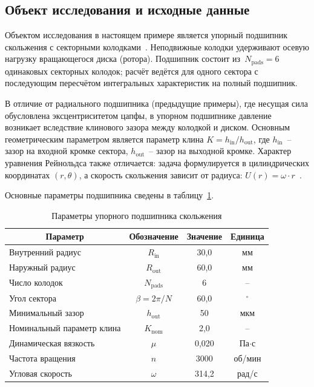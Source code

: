 \subsection{Объект исследования и исходные данные}

Объектом исследования в настоящем примере является упорный подшипник
скольжения с секторными колодками~\cite{gropper2018,wasilczuk2008}. Неподвижные колодки удерживают
осевую нагрузку вращающегося диска (ротора). Подшипник состоит
из~$N_{\mathrm{pads}} = 6$ одинаковых секторных колодок; расчёт
ведётся для одного сектора с последующим пересчётом интегральных
характеристик на полный подшипник.

В отличие от радиального подшипника (предыдущие примеры), где несущая сила
обусловлена эксцентриситетом цапфы, в упорном подшипнике давление
возникает вследствие клинового зазора между колодкой и диском.
Основным геометрическим параметром является параметр клина
$K = h_{\mathrm{in}} / h_{\mathrm{out}}$, где
$h_{\mathrm{in}}$~-- зазор на входной кромке сектора,
$h_{\mathrm{out}}$~-- зазор на выходной кромке.
Характер уравнения Рейнольдса также отличается: задача формулируется
в цилиндрических координатах $(r, \theta)$, а скорость скольжения
зависит от радиуса: $U(r) = \omega \cdot r$~\cite{brajdic2005,heinrichson2008}.

Основные параметры подшипника сведены в
таблицу~\ref{tab:thrust_params}.

\begin{table}[!ht]
\centering
\caption{Параметры упорного подшипника скольжения}
\label{tab:thrust_params}
\begin{tabularx}{\textwidth}{|X|c|c|c|}
\hline
\multicolumn{1}{|c|}{\textbf{Параметр}} & \textbf{Обозначение} & \textbf{Значение} & \textbf{Единица} \\
\hline
Внутренний радиус          & $R_{\mathrm{in}}$   & 30{,}0  & мм \\
\hline
Наружный радиус            & $R_{\mathrm{out}}$  & 60{,}0  & мм \\
\hline
Число колодок              & $N_{\mathrm{pads}}$ & 6       & -- \\
\hline
Угол сектора               & $\beta = 2\pi/N$    & 60{,}0  & $^{\circ}$ \\
\hline
Минимальный зазор          & $h_{\mathrm{out}}$  & 50      & мкм \\
\hline
Номинальный параметр клина & $K_{\mathrm{nom}}$  & 2{,}0   & -- \\
\hline
Динамическая вязкость      & $\mu$               & 0{,}020 & Па$\cdot$с \\
\hline
Частота вращения           & $n$                 & 3000    & об/мин \\
\hline
Угловая скорость           & $\omega$            & 314{,}2 & рад/с \\
\hline
\end{tabularx}
\end{table}

